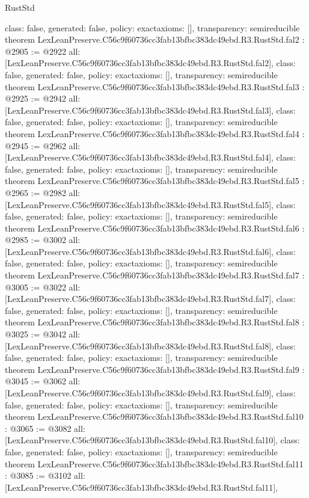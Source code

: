 \begin{lexlean}{RustStd}
\begin{coremodule}
{  class: false,
  generated: false,
  policy: exact{axioms: []},
  transparency: semireducible
}
theorem LexLeanPreserve.C56c9f60736cc3fab13bfbc383dc49ebd.R3.RustStd.fal2 : @2905 := @2922 {
  all: [LexLeanPreserve.C56c9f60736cc3fab13bfbc383dc49ebd.R3.RustStd.fal2],
  class: false,
  generated: false,
  policy: exact{axioms: []},
  transparency: semireducible
}
theorem LexLeanPreserve.C56c9f60736cc3fab13bfbc383dc49ebd.R3.RustStd.fal3 : @2925 := @2942 {
  all: [LexLeanPreserve.C56c9f60736cc3fab13bfbc383dc49ebd.R3.RustStd.fal3],
  class: false,
  generated: false,
  policy: exact{axioms: []},
  transparency: semireducible
}
theorem LexLeanPreserve.C56c9f60736cc3fab13bfbc383dc49ebd.R3.RustStd.fal4 : @2945 := @2962 {
  all: [LexLeanPreserve.C56c9f60736cc3fab13bfbc383dc49ebd.R3.RustStd.fal4],
  class: false,
  generated: false,
  policy: exact{axioms: []},
  transparency: semireducible
}
theorem LexLeanPreserve.C56c9f60736cc3fab13bfbc383dc49ebd.R3.RustStd.fal5 : @2965 := @2982 {
  all: [LexLeanPreserve.C56c9f60736cc3fab13bfbc383dc49ebd.R3.RustStd.fal5],
  class: false,
  generated: false,
  policy: exact{axioms: []},
  transparency: semireducible
}
theorem LexLeanPreserve.C56c9f60736cc3fab13bfbc383dc49ebd.R3.RustStd.fal6 : @2985 := @3002 {
  all: [LexLeanPreserve.C56c9f60736cc3fab13bfbc383dc49ebd.R3.RustStd.fal6],
  class: false,
  generated: false,
  policy: exact{axioms: []},
  transparency: semireducible
}
theorem LexLeanPreserve.C56c9f60736cc3fab13bfbc383dc49ebd.R3.RustStd.fal7 : @3005 := @3022 {
  all: [LexLeanPreserve.C56c9f60736cc3fab13bfbc383dc49ebd.R3.RustStd.fal7],
  class: false,
  generated: false,
  policy: exact{axioms: []},
  transparency: semireducible
}
theorem LexLeanPreserve.C56c9f60736cc3fab13bfbc383dc49ebd.R3.RustStd.fal8 : @3025 := @3042 {
  all: [LexLeanPreserve.C56c9f60736cc3fab13bfbc383dc49ebd.R3.RustStd.fal8],
  class: false,
  generated: false,
  policy: exact{axioms: []},
  transparency: semireducible
}
theorem LexLeanPreserve.C56c9f60736cc3fab13bfbc383dc49ebd.R3.RustStd.fal9 : @3045 := @3062 {
  all: [LexLeanPreserve.C56c9f60736cc3fab13bfbc383dc49ebd.R3.RustStd.fal9],
  class: false,
  generated: false,
  policy: exact{axioms: []},
  transparency: semireducible
}
theorem LexLeanPreserve.C56c9f60736cc3fab13bfbc383dc49ebd.R3.RustStd.fal10 : @3065 := @3082 {
  all: [LexLeanPreserve.C56c9f60736cc3fab13bfbc383dc49ebd.R3.RustStd.fal10],
  class: false,
  generated: false,
  policy: exact{axioms: []},
  transparency: semireducible
}
theorem LexLeanPreserve.C56c9f60736cc3fab13bfbc383dc49ebd.R3.RustStd.fal11 : @3085 := @3102 {
  all: [LexLeanPreserve.C56c9f60736cc3fab13bfbc383dc49ebd.R3.RustStd.fal11],
}
\end{coremodule}
\end{lexlean}

